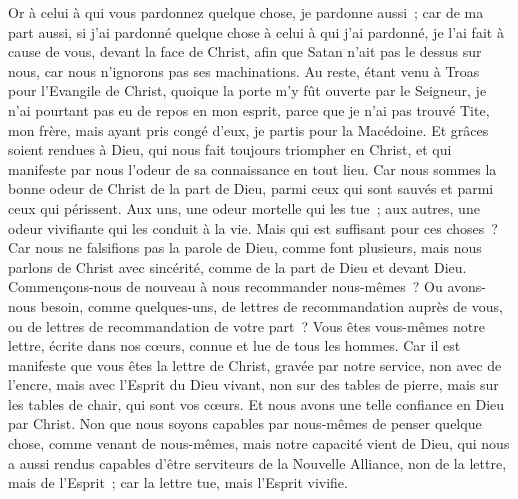 \begin{multicols}{2}
Or à celui à qui vous pardonnez quelque chose, je pardonne aussi~; car de ma part aussi, si j'ai pardonné quelque chose à celui à qui j'ai pardonné, je l'ai fait à cause de vous, devant la face de Christ,
afin que Satan n'ait pas le dessus sur nous, car nous n'ignorons pas ses machinations.
Au reste, étant venu à Troas pour l'Evangile de Christ, quoique la porte m'y fût ouverte par le Seigneur, je n'ai pourtant pas eu de repos en mon esprit, parce que je n'ai pas trouvé Tite, mon frère,
mais ayant pris congé d'eux, je partis pour la Macédoine.
Et grâces soient rendues à Dieu, qui nous fait toujours triompher en Christ, et qui manifeste par nous l'odeur de sa connaissance en tout lieu.
Car nous sommes la bonne odeur de Christ de la part de Dieu, parmi ceux qui sont sauvés et parmi ceux qui périssent.
Aux uns, une odeur mortelle qui les tue~; aux autres, une odeur vivifiante qui les conduit à la vie. Mais qui est suffisant pour ces choses~?
Car nous ne falsifions pas la parole de Dieu, comme font plusieurs, mais nous parlons de Christ avec sincérité, comme de la part de Dieu et devant Dieu.
\VerseOne{}Commençons-nous de nouveau à nous recommander nous-mêmes~? Ou avons-nous besoin, comme quelques-uns, de lettres de recommandation auprès de vous, ou de lettres de recommandation de votre part~?
Vous êtes vous-mêmes notre lettre, écrite dans nos cœurs, connue et lue de tous les hommes.
Car il est manifeste que vous êtes la lettre de Christ, gravée par notre service, non avec de l'encre, mais avec l'Esprit du Dieu vivant, non sur des tables de pierre, mais sur les tables de chair, qui sont vos cœurs.
Et nous avons une telle confiance en Dieu par Christ.
Non que nous soyons capables par nous-mêmes de penser quelque chose, comme venant de nous-mêmes, mais notre capacité vient de Dieu,
qui nous a aussi rendus capables d'être serviteurs de la Nouvelle Alliance, non de la lettre, mais de l'Esprit~; car la lettre tue, mais l'Esprit vivifie.

\end{multicols}
